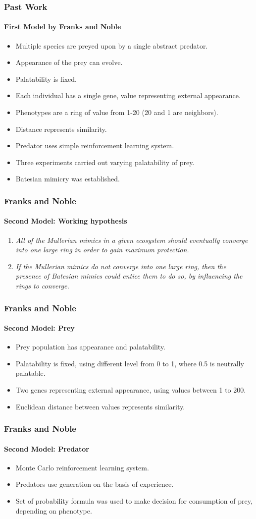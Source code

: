 \frame
{
	\frametitle{Past Work}
	\framesubtitle{First Model by Franks and Noble}

	\begin{itemize}
		\item Multiple species are preyed upon by a single abstract predator.
		\item Appearance of the prey can evolve.
		\item Palatability is fixed.
		\item Each individual has a single gene, value representing external appearance.
		\item Phenotypes are a ring of value from 1-20 (20 and 1 are neighbors).
		\item Distance represents similarity.
		\item Predator uses simple reinforcement learning system.
		\item Three experiments carried out varying palatability of prey.
		\item Batesian mimicry was established.
	\end{itemize}
}

\frame
{
	\frametitle{Franks and Noble}
	\framesubtitle{Second Model: Working hypothesis}

	\begin{enumerate}
		\item \textsl{All of the Mullerian mimics in a given ecosystem should eventually converge into one large ring in order to gain maximum protection.}
		\item \textsl{If the Mullerian mimics do not converge into one large ring, then the presence of Batesian mimics could entice them to do so, by influencing the rings to converge.}
	\end{enumerate}
}

\frame
{
	\frametitle{Franks and Noble}
	\framesubtitle{Second Model: Prey}

	\begin{itemize}
		\item Prey population has appearance and palatability.
		\item Palatability is fixed, using different level from 0 to 1, where 0.5 is neutrally palatable.
		\item Two genes representing external appearance, using values between 1 to 200.
		\item Euclidean distance between values represents similarity.
	\end{itemize}
}

\frame
{
	\frametitle{Franks and Noble}
	\framesubtitle{Second Model: Predator}

	\begin{itemize}
		\item Monte Carlo reinforcement learning system.
		\item Predators use generation on the basis of experience.
		\item Set of probability formula was used to make decision for consumption of prey, depending on phenotype.
	\end{itemize}
}

